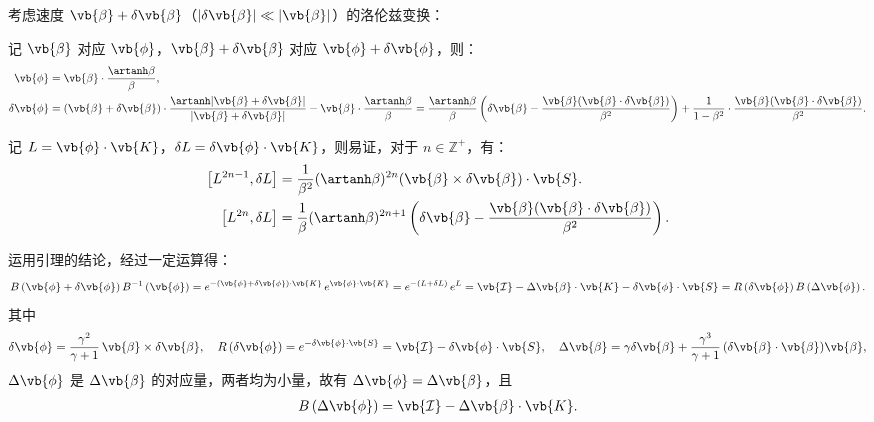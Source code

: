 考虑速度 \(\vb{\beta} + \delta\vb{\beta}\)（\(|\delta\vb{\beta}| \ll |\vb{\beta}|\)）的洛伦兹变换：

记 \(\vb{\beta}\) 对应 \(\vb{\phi}\)，\(\vb{\beta} + \delta\vb{\beta}\) 对应 \(\vb{\phi} + \delta\vb{\phi}\)，则：
\begin{align*}
	\vb{\phi} &= \vb{\beta} \cdot \dfrac{\artanh\beta}{\beta},\\
	\delta\vb{\phi} &= (\vb{\beta} + \delta\vb{\beta}) \cdot \dfrac{\artanh|\vb{\beta} + \delta\vb{\beta}|}{|\vb{\beta} + \delta\vb{\beta}|} - \vb{\beta} \cdot \dfrac{\artanh\beta}{\beta} = \dfrac{\artanh\beta}{\beta} \left( \delta\vb{\beta} - \dfrac{\vb{\beta}(\vb{\beta} \cdot \delta\vb{\beta})}{\beta^2} \right) + \dfrac{1}{1 - \beta^2} \cdot \dfrac{\vb{\beta}(\vb{\beta} \cdot \delta\vb{\beta})}{\beta^2}.
\end{align*}

记 \(L = \vb{\phi} \cdot \vb{K}\)，\(\delta L = \delta\vb{\phi} \cdot \vb{K}\)，则易证，对于 \(n \in \mathbb{Z}^+\)，有：
\begin{align*}
	\left[ L^{2n-1}, \delta L \right] &= \dfrac{1}{\beta^2} (\artanh\beta)^{2n} (\vb{\beta} \times \delta\vb{\beta}) \cdot \vb{S}.\\
	\left[ L^{2n}, \delta L \right] &= \dfrac{1}{\beta} (\artanh\beta)^{2n+1} \left( \delta\vb{\beta} - \dfrac{\vb{\beta}(\vb{\beta} \cdot \delta\vb{\beta})}{\beta^2} \right).
\end{align*}

运用引理的结论，经过一定运算得：
\begin{align*}
	B\left( \vb{\phi} + \delta\vb{\phi} \right) B^{-1}\left( \vb{\phi} \right)
	= e^{-(\vb{\phi} + \delta\vb{\phi}) \cdot \vb{K}} \, e^{\vb{\phi} \cdot \vb{K}}
	= e^{-(L + \delta L)} \, e^L
	= \vb{\mathcal{I}} - \Delta\vb{\beta} \cdot \vb{K} - \delta\vb{\phi} \cdot \vb{S}
	= R\left( \delta\vb{\phi} \right) B\left( \Delta\vb{\phi} \right).
\end{align*}
其中
\begin{align*}
	\delta\vb{\phi} = \dfrac{\gamma^2}{\gamma + 1} \, \vb{\beta} \times \delta\vb{\beta}, \quad
	R\left( \delta\vb{\phi} \right) = e^{-\delta\vb{\phi} \cdot \vb{S}} = \vb{\mathcal{I}} - \delta\vb{\phi} \cdot \vb{S},\quad
	\Delta\vb{\beta} = \gamma \delta\vb{\beta} + \dfrac{\gamma^3}{\gamma + 1} \, (\delta\vb{\beta} \cdot \vb{\beta}) \vb{\beta},
\end{align*}
\(\Delta\vb{\phi}\) 是 \(\Delta\vb{\beta}\) 的对应量，两者均为小量，故有 \(\Delta\vb{\phi} = \Delta\vb{\beta}\)，且
\begin{align*}
	B\left( \Delta\vb{\phi} \right) = \vb{\mathcal{I}} - \Delta\vb{\beta} \cdot \vb{K}.
\end{align*}

